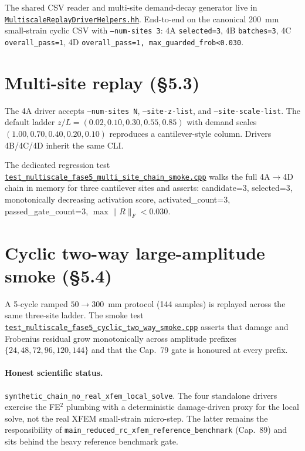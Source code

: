 The shared CSV reader and multi-site demand-decay generator live in
\href{run:src/validation/MultiscaleReplayDriverHelpers.hh}{%
\texttt{MultiscaleReplayDriverHelpers.hh}}. End-to-end on the canonical
200~mm small-strain cyclic CSV with \texttt{--num-sites 3}: 4A
\texttt{selected=3}, 4B \texttt{batches=3}, 4C \texttt{overall\_pass=1},
4D \texttt{overall\_pass=1, max\_guarded\_frob<0.030}.

\section{Multi-site replay (\S5.3)}

The 4A driver accepts \texttt{--num-sites N},
\texttt{--site-z-list}, and \texttt{--site-scale-list}. The default
ladder \(z/L = (0.02, 0.10, 0.30, 0.55, 0.85)\) with demand scales
\((1.00, 0.70, 0.40, 0.20, 0.10)\) reproduces a cantilever-style
column. Drivers 4B/4C/4D inherit the same CLI.

The dedicated regression test
\href{run:tests/test_multiscale_fase5_multi_site_chain_smoke.cpp}{%
\texttt{test\_multiscale\_fase5\_multi\_site\_chain\_smoke.cpp}}
walks the full 4A\(\to\)4D chain in memory for three cantilever sites
and asserts: candidate=3, selected=3, monotonically decreasing
activation score, activated\_count=3, passed\_gate\_count=3,
\(\max\|R\|_F<0.030\).

\section{Cyclic two-way large-amplitude smoke (\S5.4)}

A 5-cycle ramped \(50\to300\)~mm protocol (144 samples) is replayed
across the same three-site ladder. The smoke test
\href{run:tests/test_multiscale_fase5_cyclic_two_way_smoke.cpp}{%
\texttt{test\_multiscale\_fase5\_cyclic\_two\_way\_smoke.cpp}} asserts
that damage and Frobenius residual grow monotonically across amplitude
prefixes \(\{24,48,72,96,120,144\}\) and that the Cap.~79 gate is
honoured at every prefix.

\paragraph{Honest scientific status.} \texttt{synthetic\_chain\_no\_real\_xfem\_local\_solve}.
The four standalone drivers exercise the FE\(^2\) plumbing with a
deterministic damage-driven proxy for the local solve, not the real
XFEM small-strain micro-step. The latter remains the responsibility of
\texttt{main\_reduced\_rc\_xfem\_reference\_benchmark} (Cap.~89) and
sits behind the heavy reference benchmark gate.

